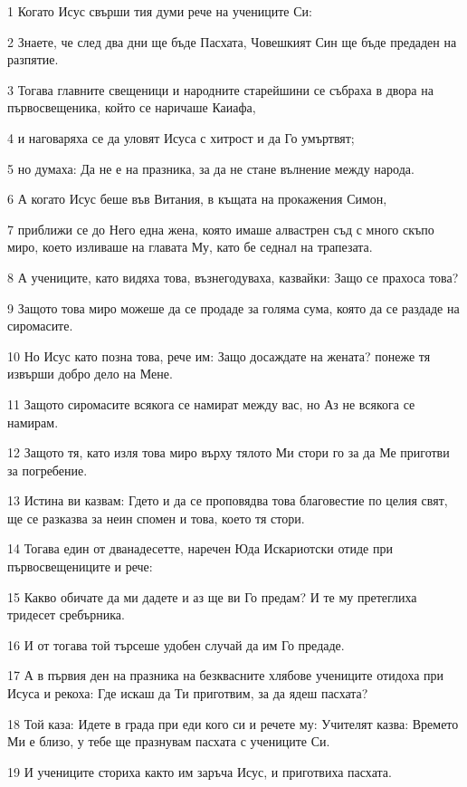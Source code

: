 \par 1 Когато Исус свърши тия думи рече на учениците Си:
\par 2 Знаете, че след два дни ще бъде Пасхата, Човешкият Син ще бъде предаден на разпятие.
\par 3 Тогава главните свещеници и народните старейшини се събраха в двора на първосвещеника, който се наричаше Каиафа,
\par 4 и наговаряха се да уловят Исуса с хитрост и да Го умъртвят;
\par 5 но думаха: Да не е на празника, за да не стане вълнение между народа.
\par 6 А когато Исус беше във Витания, в къщата на прокажения Симон,
\par 7 приближи се до Него една жена, която имаше алвастрен съд с много скъпо миро, което изливаше на главата Му, като бе седнал на трапезата.
\par 8 А учениците, като видяха това, възнегодуваха, казвайки: Защо се прахоса това?
\par 9 Защото това миро можеше да се продаде за голяма сума, която да се раздаде на сиромасите.
\par 10 Но Исус като позна това, рече им: Защо досаждате на жената? понеже тя извърши добро дело на Мене.
\par 11 Защото сиромасите всякога се намират между вас, но Аз не всякога се намирам.
\par 12 Защото тя, като изля това миро върху тялото Ми стори го за да Ме приготви за погребение.
\par 13 Истина ви казвам: Гдето и да се проповядва това благовестие по целия свят, ще се разказва за неин спомен и това, което тя стори.
\par 14 Тогава един от дванадесетте, наречен Юда Искариотски отиде при първосвещениците и рече:
\par 15 Какво обичате да ми дадете и аз ще ви Го предам? И те му претеглиха тридесет сребърника.
\par 16 И от тогава той търсеше удобен случай да им Го предаде.
\par 17 А в първия ден на празника на безквасните хлябове учениците отидоха при Исуса и рекоха: Где искаш да Ти приготвим, за да ядеш пасхата?
\par 18 Той каза: Идете в града при еди кого си и речете му: Учителят казва: Времето Ми е близо, у тебе ще празнувам пасхата с учениците Си.
\par 19 И учениците сториха както им заръча Исус, и приготвиха пасхата.
